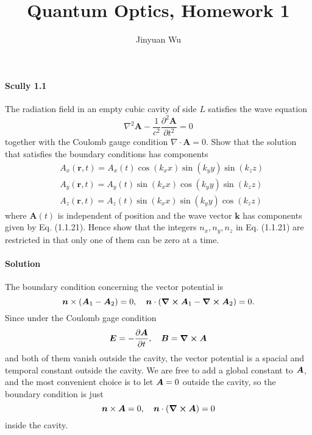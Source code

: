 \documentclass[hyperref, a4paper]{article}
\title{Quantum Optics, Homework 1}
\author{Jinyuan Wu}
\begin{document}
\maketitle

\paragraph{Scully 1.1} The radiation field in an empty cubic cavity of side $L$ satisfies the wave equation
\begin{equation}
    \nabla^{2} \mathbf{A}-\frac{1}{c^{2}} \frac{\partial^{2} \mathbf{A}}{\partial t^{2}}=0
    \label{eq:scully-1-1-1}
\end{equation}
together with the Coulomb gauge condition $\nabla \cdot \mathbf{A}=0$. Show that the solution that satisfies the boundary conditions has components
\begin{equation}
    \begin{aligned}
        &A_{x}(\mathbf{r}, t)=A_{x}(t) \cos \left(k_{x} x\right) \sin \left(k_{y} y\right) \sin \left(k_{z} z\right) \\
        &A_{y}(\mathbf{r}, t)=A_{y}(t) \sin \left(k_{x} x\right) \cos \left(k_{y} y\right) \sin \left(k_{z} z\right) \\
        &A_{z}(\mathbf{r}, t)=A_{z}(t) \sin \left(k_{x} x\right) \sin \left(k_{y} y\right) \cos \left(k_{z} z\right)
        \end{aligned}
    \label{eq:scully-1-1-2}
\end{equation}
where $\mathbf{A}(t)$ is independent of position and the wave vector $\mathbf{k}$ has components given by Eq. (1.1.21). Hence show that the integers $n_{x}, n_{y}, n_{z}$ in Eq. (1.1.21) are restricted in that only one of them can be zero at a time.

\paragraph{Solution} The boundary condition concerning the vector potential is
\[
    \vb*{n} \times (\vb*{A}_1 - \vb*{A}_2) = 0, \quad \vb*{n} \cdot (\curl{\vb*{A}_1} - \curl{\vb*{A}_2}) = 0.
\]
Since under the Coulomb gage condition
\[
    \vb*{E} = - \pdv{\vb*{A}}{t}, \quad \vb*{B} = \curl{\vb*{A}}
\]
and both of them vanish outside the cavity, the vector potential is a spacial and temporal constant outside the cavity.
We are free to add a global constant to $\vb*{A}$, and the most convenient choice is to let $\vb*{A} = 0$ outside the cavity, so the boundary condition is just
\[
    \vb*{n} \times \vb*{A} = 0, \quad \vb*{n} \cdot (\curl{\vb*{A}}) = 0
\]
inside the cavity.
\end{document}
